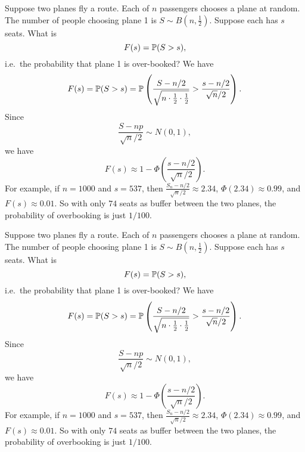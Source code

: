\begin{note}
  \begin{field}
    \begin{eg}
      Suppose two planes fly a route. Each of $n$ passengers chooses a plane at random. The number of people choosing plane 1 is $S\sim B(n, \frac{1}{2})$. Suppose each has $s$ seats. What is
      \[
        F(s) = \P(S > s),
      \]
      i.e.\ the probability that plane 1 is over-booked? We have
      \[
        F(s) = \P(S > s) = \P\left(\frac{S - n/2}{\sqrt{n\cdot \frac{1}{2}\cdot \frac{1}{2}}} > \frac{s - n/2}{\sqrt{n}/2}\right).
      \]
      Since
      \[
        \frac{S - np}{\sqrt{n}/2}\sim N(0, 1),
      \]
      we have
      \[
        F(s) \approx 1 - \Phi\left(\frac{s - n/2}{\sqrt{n}/2}\right).
      \]
      For example, if $n = 1000$ and $s = 537$, then $\frac{S_n - n/2}{\sqrt{n}/2}\approx 2.34$, $\Phi(2.34)\approx 0.99$, and $F(s) \approx 0.01$. So with only $74$ seats as buffer between the two planes, the probability of overbooking is just $1/100$.
    \end{eg}
  \end{field}
  \begin{field}
    \begin{eg}
      Suppose two planes fly a route. Each of $n$ passengers chooses a plane at random. The number of people choosing plane 1 is $S\sim B(n, \frac{1}{2})$. Suppose each has $s$ seats. What is
      \[
        F(s) = \P(S > s),
      \]
      i.e.\ the probability that plane 1 is over-booked? We have
      \[
        F(s) = \P(S > s) = \P\left(\frac{S - n/2}{\sqrt{n\cdot \frac{1}{2}\cdot \frac{1}{2}}} > \frac{s - n/2}{\sqrt{n}/2}\right).
      \]
      Since
      \[
        \frac{S - np}{\sqrt{n}/2}\sim N(0, 1),
      \]
      we have
      \[
        F(s) \approx 1 - \Phi\left(\frac{s - n/2}{\sqrt{n}/2}\right).
      \]
      For example, if $n = 1000$ and $s = 537$, then $\frac{S_n - n/2}{\sqrt{n}/2}\approx 2.34$, $\Phi(2.34)\approx 0.99$, and $F(s) \approx 0.01$. So with only $74$ seats as buffer between the two planes, the probability of overbooking is just $1/100$.
    \end{eg}
  \end{field}
  \xplain{}%
\end{note}

